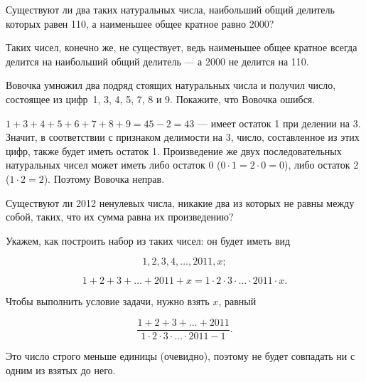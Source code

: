 ﻿


\begin{itemize}
\itA Существуют ли два таких натуральных числа, наибольший общий делитель которых равен 110, а наименьшее общее кратное равно 2000?

\itr Таких чисел, конечно же, не существует, ведь наименьшее общее кратное всегда делится на наибольший общий делитель — а 2000 не делится на 110.

\itB Вовочка умножил два подряд стоящих натуральных числа и получил число, состоящее из цифр~1, 3, 4, 5, 7, 8 и 9. Покажите, что Вовочка ошибся.

\itr $1+3+4+5+6+7+8+9=45-2=43$ — имеет остаток 1 при делении на 3. Значит, в соответствии с признаком делимости на 3, число, составленное из этих цифр, также будет иметь остаток 1. Произведение же двух последовательных натуральных чисел может иметь либо остаток 0 ($0 \cdot 1 = 2 \cdot 0 = 0$), либо остаток 2 ($1 \cdot 2 = 2$). Поэтому Вовочка неправ.

\itC Существуют ли 2012 ненулевых числа, никакие два из которых не равны между собой, таких, что их сумма равна их произведению?

\itr Укажем, как построить набор из таких чисел: он будет иметь вид

\vspace{-0.4cm}
$$1, 2, 3, 4, \ldots, 2011, x;$$

\vspace{-0.4cm}
$$1+2+3+\ldots+2011+x=1\cdot 2\cdot 3\cdot\ldots\cdot2011\cdot x.$$

Чтобы выполнить условие задачи, нужно взять $x$, равный

$$\frac{1+2+3+\ldots+2011}{1 \cdot 2 \cdot 3 \cdot \ldots \cdot 2011 - 1}.$$

Это число строго меньше единицы (очевидно), поэтому не будет совпадать ни с одним из взятых до него.
\end{itemize}


